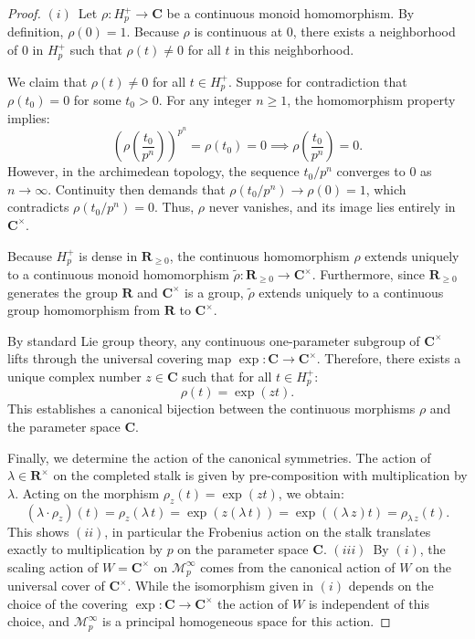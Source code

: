 \documentclass[11pt,a4paper]{article}
\newcommand{\C}{\mathbf{C}}
\newcommand{\R}{\mathbf{R}}
\begin{document}
\begin{proof}
$(i)$~Let $\rho : H_p^+ \to \C$ be a continuous monoid homomorphism. By definition, $\rho(0) = 1$. Because $\rho$ is continuous at $0$, there exists a neighborhood of $0$ in $H_p^+$ such that $\rho(t) \neq 0$ for all $t$ in this neighborhood. 

We claim that $\rho(t) \neq 0$ for all $t \in H_p^+$. Suppose for contradiction that $\rho(t_0) = 0$ for some $t_0 > 0$. For any integer $n \ge 1$, the homomorphism property implies:
\[
\left( \rho\left(\frac{t_0}{p^n}\right) \right)^{p^n} = \rho(t_0) = 0 \implies \rho\left(\frac{t_0}{p^n}\right) = 0.
\]
However, in the archimedean topology, the sequence $t_0/p^n$ converges to $0$ as $n \to \infty$. Continuity then demands that $\rho(t_0/p^n) \to \rho(0) = 1$, which contradicts $\rho(t_0/p^n) = 0$. Thus, $\rho$ never vanishes, and its image lies entirely in $\C^\times$.

Because $H_p^+$ is dense in $\R_{\ge 0}$, the continuous homomorphism $\rho$ extends uniquely to a continuous monoid homomorphism $\tilde{\rho} : \R_{\ge 0} \to \C^\times$. Furthermore, since $\R_{\ge 0}$ generates the group $\R$ and $\C^\times$ is a group, $\tilde{\rho}$ extends uniquely to a continuous group homomorphism from $\R$ to $\C^\times$. 

By standard Lie group theory, any continuous one-parameter subgroup of $\C^\times$ lifts through the universal covering map $\exp : \C \to \C^\times$. Therefore, there exists a unique complex number $z \in \C$ such that for all $t \in H_p^+$:
\[
\rho(t) = \exp(zt).
\]
This establishes a canonical bijection between the continuous morphisms $\rho$ and the parameter space $\C$.

Finally, we determine the action of the canonical symmetries. The  action of $\lambda \in \R^\times$ on the completed stalk is given by pre-composition with multiplication by $\lambda$. Acting on the morphism $\rho_z(t) = \exp(zt)$, we obtain:
\[
(\lambda \cdot \rho_z)(t) = \rho_z(\lambda \,t) = \exp(z(\lambda\,t)) = \exp((\lambda\,z)t) = \rho_{\lambda\,z}(t).
\]
This shows $(ii)$, in particular the Frobenius action on the stalk translates exactly to multiplication by $p$ on the parameter space $\C$.\newline
$(iii)$~By $(i)$, the scaling action of $W=\C^\times$ on $\mathcal{M}_{p}^{\infty}$ comes from the canonical action of $W$ on the universal cover of $\C^\times$. While the isomorphism given in $(i)$ depends on the choice of the covering $\exp:\C\to \C^\times$ the action of $W$ is independent of this choice, and $\mathcal{M}_{p}^{\infty}$ is a principal homogeneous space for this action.
\end{proof}
\end{document}
